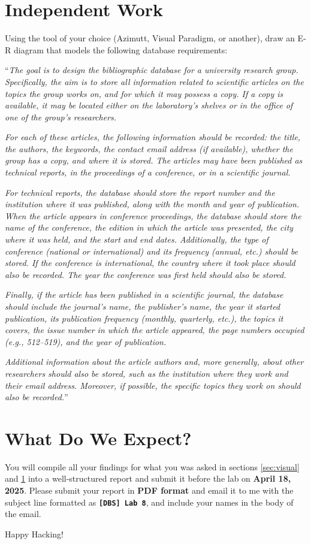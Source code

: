 \documentclass{article}
\begin{document}
\section{Independent Work} \label{sec:work}
Using the tool of your choice (Azimutt, Visual Paradigm, or another), draw an E-R diagram that models the following database requirements:

``\textit{The goal is to design the bibliographic database for a university research group. Specifically, the aim is to store all information related to scientific articles on the topics the group works on, and for which it may possess a copy. If a copy is available, it may be located either on the laboratory’s shelves or in the office of one of the group’s researchers.}

\textit{For each of these articles, the following information should be recorded: the title, the authors, the keywords, the contact email address (if available), whether the group has a copy, and where it is stored. The articles may have been published as technical reports, in the proceedings of a conference, or in a scientific journal.}

\textit{For technical reports, the database should store the report number and the institution where it was published, along with the month and year of publication. When the article appears in conference proceedings, the database should store the name of the conference, the edition in which the article was presented, the city where it was held, and the start and end dates. Additionally, the type of conference (national or international) and its frequency (annual, etc.) should be stored. If the conference is international, the country where it took place should also be recorded. The year the conference was first held should also be stored.}

\textit{Finally, if the article has been published in a scientific journal, the database should include the journal’s name, the publisher’s name, the year it started publication, its publication frequency (monthly, quarterly, etc.), the topics it covers, the issue number in which the article appeared, the page numbers occupied (e.g., 512–519), and the year of publication.}

\textit{Additional information about the article authors and, more generally, about other researchers should also be stored, such as the institution where they work and their email address. Moreover, if possible, the specific topics they work on should also be recorded.}''

\section{What Do We Expect?}
You will compile all your findings for what you was asked in sections \ref{sec:visual} and \ref{sec:work} into a well-structured report and submit it before the lab on \textbf{April 18, 2025}. Please submit your report in \textbf{PDF format} and email it to me with the subject line formatted as {\LARGE \textbf{\texttt{[DBS] Lab 8}}}, and include your names in the body of the email.

\vspace{5mm}
Happy Hacking! 
\end{document}
